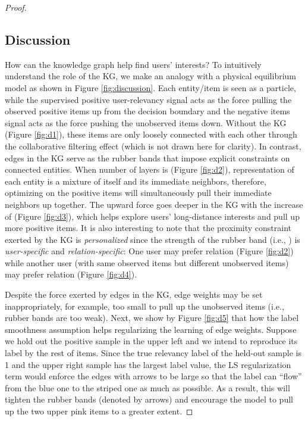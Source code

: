 \documentclass[sigconf]{acmart}
\begin{document}
\begin{proof}
\subsection{Discussion}
	\label{sec:discussion}
		How can the knowledge graph help find users' interests?
		To intuitively understand the role of the KG, we make an analogy with a physical equilibrium model as shown in Figure \ref{fig:discussion}.
		Each entity/item is seen as a particle, while the supervised positive user-relevancy signal acts as the force pulling the observed positive items up from the decision boundary and the negative items signal acts as the force pushing the unobserved items down.
		Without the KG (Figure \ref{fig:d1}), these items are only loosely connected with each other through the collaborative filtering effect (which is not drawn here for clarity).
		In contrast, edges in the KG serve as the rubber bands that impose explicit constraints on connected entities.
		When number of layers is  (Figure \ref{fig:d2}), representation of each entity is a mixture of itself and its immediate neighbors, therefore, optimizing on the positive items will simultaneously pull their immediate neighbors up together.
		The upward force goes deeper in the KG with the increase of  (Figure \ref{fig:d3}), which helps explore users' long-distance interests and pull up more positive items.
		It is also interesting to note that the proximity constraint exerted by the KG is \textit{personalized} since the strength of the rubber band (i.e., ) is \textit{user-specific} and \textit{relation-specific}:
		One user may prefer relation  (Figure \ref{fig:d2}) while another user (with same observed items but different unobserved items) may prefer relation  (Figure \ref{fig:d4}).
		
		Despite the force exerted by edges in the KG, edge weights may be set inappropriately, for example, too small to pull up the unobserved items (i.e., rubber bands are too weak).
		Next, we show by Figure \ref{fig:d5} that how the label smoothness assumption helps regularizing the learning of edge weights.
		Suppose we hold out the positive sample in the upper left and we intend to reproduce its label by the rest of items.
		Since the true relevancy label of the held-out sample is 1 and the upper right sample has the largest label value, the LS regularization term  would enforce the edges with arrows to be large so that the label can ``flow'' from the blue one to the striped one as much as possible.
		As a result, this will tighten the rubber bands (denoted by arrows) and encourage the model to pull up the two upper pink items to a greater extent.
		

\end{proof}
\end{document}
